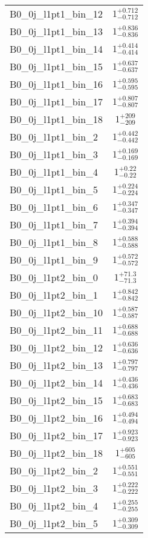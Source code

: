 \begin{tabular}{|l|c|}
B0\_0j\_l1pt1\_bin\_12 & $1^{+0.712}_{-0.712}$ \\
B0\_0j\_l1pt1\_bin\_13 & $1^{+0.836}_{-0.836}$ \\
B0\_0j\_l1pt1\_bin\_14 & $1^{+0.414}_{-0.414}$ \\
B0\_0j\_l1pt1\_bin\_15 & $1^{+0.637}_{-0.637}$ \\
B0\_0j\_l1pt1\_bin\_16 & $1^{+0.595}_{-0.595}$ \\
B0\_0j\_l1pt1\_bin\_17 & $1^{+0.807}_{-0.807}$ \\
B0\_0j\_l1pt1\_bin\_18 & $1^{+209}_{-209}$ \\
B0\_0j\_l1pt1\_bin\_2 & $1^{+0.442}_{-0.442}$ \\
B0\_0j\_l1pt1\_bin\_3 & $1^{+0.169}_{-0.169}$ \\
B0\_0j\_l1pt1\_bin\_4 & $1^{+0.22}_{-0.22}$ \\
B0\_0j\_l1pt1\_bin\_5 & $1^{+0.224}_{-0.224}$ \\
B0\_0j\_l1pt1\_bin\_6 & $1^{+0.347}_{-0.347}$ \\
B0\_0j\_l1pt1\_bin\_7 & $1^{+0.394}_{-0.394}$ \\
B0\_0j\_l1pt1\_bin\_8 & $1^{+0.588}_{-0.588}$ \\
B0\_0j\_l1pt1\_bin\_9 & $1^{+0.572}_{-0.572}$ \\
B0\_0j\_l1pt2\_bin\_0 & $1^{+71.3}_{-71.3}$ \\
B0\_0j\_l1pt2\_bin\_1 & $1^{+0.842}_{-0.842}$ \\
B0\_0j\_l1pt2\_bin\_10 & $1^{+0.587}_{-0.587}$ \\
B0\_0j\_l1pt2\_bin\_11 & $1^{+0.688}_{-0.688}$ \\
B0\_0j\_l1pt2\_bin\_12 & $1^{+0.636}_{-0.636}$ \\
B0\_0j\_l1pt2\_bin\_13 & $1^{+0.797}_{-0.797}$ \\
B0\_0j\_l1pt2\_bin\_14 & $1^{+0.436}_{-0.436}$ \\
B0\_0j\_l1pt2\_bin\_15 & $1^{+0.683}_{-0.683}$ \\
B0\_0j\_l1pt2\_bin\_16 & $1^{+0.494}_{-0.494}$ \\
B0\_0j\_l1pt2\_bin\_17 & $1^{+0.923}_{-0.923}$ \\
B0\_0j\_l1pt2\_bin\_18 & $1^{+605}_{-605}$ \\
B0\_0j\_l1pt2\_bin\_2 & $1^{+0.551}_{-0.551}$ \\
B0\_0j\_l1pt2\_bin\_3 & $1^{+0.222}_{-0.222}$ \\
B0\_0j\_l1pt2\_bin\_4 & $1^{+0.255}_{-0.255}$ \\
B0\_0j\_l1pt2\_bin\_5 & $1^{+0.309}_{-0.309}$ \\

\end{tabular}

